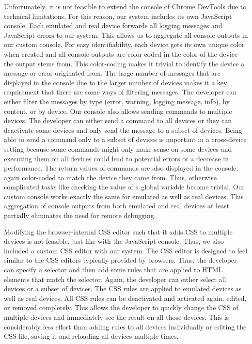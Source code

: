 Unfortunately, it is not feasible to extend the console of Chrome DevTools due to technical limitations. For this reason, our system includes its own JavaScript console. Each emulated and real device forwards all logging messages and JavaScript errors to our system. This allows us to aggregate all console outputs in our custom console. For easy identifiability, each device gets its own unique color when created and all console outputs are color-coded in the color of the device the output stems from. This color-coding makes it trivial to identify the device a message or error originated from. The large number of messages that are displayed in the console due to the larger number of devices makes it a key requirement that there are some ways of filtering messages. The developer can either filter the messages by type (error, warning, logging message, info), by content, or by device. Our console also allows sending commands to multiple devices. The developer can either send a command to all devices or they can deactivate some devices and only send the message to a subset of devices. Being able to send a command only to a subset of devices is important in a cross-device setting because some commands might only make sense on some devices and executing them on all devices could lead to potential errors or a decrease in performance. The return values of commands are also displayed in the console, again color-coded to match the device they came from. Thus, otherwise complicated tasks like checking the value of a global variable become trivial. Our custom console works exactly the same for emulated as well as real devices. This aggregation of console outputs from both emulated and real devices at least partially eliminates the need for remote debugging.

Modifying the browser-internal CSS editor such that it adds CSS to multiple devices is not feasible, just like with the JavaScript console. Thus, we also included a custom CSS editor with our system. The CSS editor is designed to feel similar to the CSS editors typically provided by browsers. Thus, the developer can specify a selector and then add some rules that are applied to HTML elements that match the selector. Again, the developer can either select all devices or a subset of devices. The CSS rules are applied to emulated devices as well as real devices. All CSS rules can be deactivated and activated again, edited, or removed completely. This allows the developer to quickly change the CSS of multiple devices and immediately see the result on all those devices. This is considerably less effort than adding rules to all devices individually or editing the CSS file, saving it and reloading all devices multiple times.

